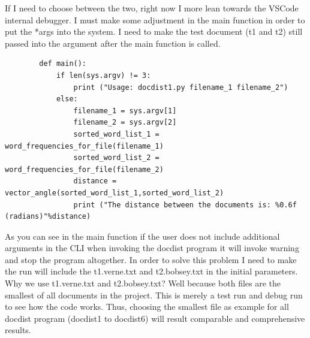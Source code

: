 \documentclass{article}
\begin{document}
    If I need to choose between the two, right now I more lean towards the VSCode internal debugger. 
    I must make some adjustment in the main function in order to put the *args into the system. 
    I need to make the test document (t1 and t2) still passed into the argument after the main function is called.
    \begin{lstlisting}
        def main():
            if len(sys.argv) != 3:
                print ("Usage: docdist1.py filename_1 filename_2")
            else:
                filename_1 = sys.argv[1]
                filename_2 = sys.argv[2]
                sorted_word_list_1 = word_frequencies_for_file(filename_1)
                sorted_word_list_2 = word_frequencies_for_file(filename_2)
                distance = vector_angle(sorted_word_list_1,sorted_word_list_2)
                print ("The distance between the documents is: %0.6f (radians)"%distance)
    \end{lstlisting}
    As you can see in the main function if the user does not include additional arguments in the CLI when invoking the docdist program it will invoke warning and stop the program altogether.
    In order to solve this problem I need to make the run will include the t1.verne.txt and t2.bobsey.txt in the initial parameters.
    Why we use t1.verne.txt and t2.bobsey.txt? Well because both files are the smallest of all documents in the project.
    This is merely a test run and debug run to see how the code works.
    Thus, choosing the smallest file as example for all docdist program (docdist1 to docdist6) will result comparable and comprehensive results.
\end{document}
